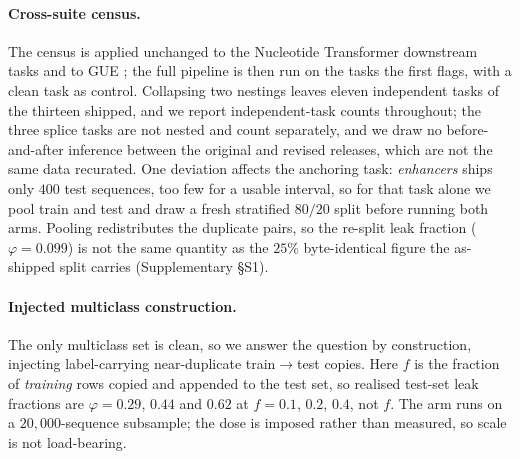 \documentclass[webpdf,modern,large,namedate]{oup-authoring-template}%
\begin{document}
\paragraph{Cross-suite census.} The census is applied unchanged to the Nucleotide Transformer downstream tasks \citep{dallatorre2024nucleotide} and to GUE \citep{zhou2023dnabert2}; the full pipeline is then run on the tasks the first flags, with a clean task as control. Collapsing two nestings leaves eleven independent tasks of the thirteen shipped, and we report independent-task counts throughout; the three splice tasks are not nested and count separately, and we draw no before-and-after inference between the original and revised releases, which are not the same data recurated. One deviation affects the anchoring task: \textit{enhancers} ships only $400$ test sequences, too few for a usable interval, so for that task alone we pool train and test and draw a fresh stratified $80/20$ split before running both arms. Pooling redistributes the duplicate pairs, so the re-split leak fraction ($\varphi=0.099$) is not the same quantity as the $25\%$ byte-identical figure the as-shipped split carries (Supplementary \S S1).

\paragraph{Injected multiclass construction.} The only multiclass set is clean, so we answer the question by construction, injecting label-carrying near-duplicate train$\to$test copies. Here $f$ is the fraction of \emph{training} rows copied and appended to the test set, so realised test-set leak fractions are $\varphi=0.29$, $0.44$ and $0.62$ at $f=0.1$, $0.2$, $0.4$, not $f$. The arm runs on a $20{,}000$-sequence subsample; the dose is imposed rather than measured, so scale is not load-bearing.
\end{document}
